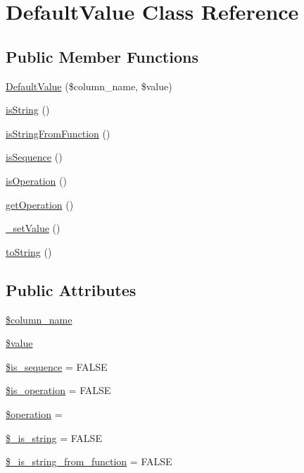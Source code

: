 \hypertarget{classDefaultValue}{}\section{Default\+Value Class Reference}
\label{classDefaultValue}
\subsection*{Public Member Functions}
\begin{DoxyCompactItemize}
\item 
\hyperlink{classDefaultValue_a738994d0f9563b86310d85ede30c2fc7}{Default\+Value} (\$column\+\_\+name, \$value)
\item 
\hyperlink{classDefaultValue_a2ff17e887cf955aea26fbb1b3e11f491}{is\+String} ()
\item 
\hyperlink{classDefaultValue_aeef8c65be1e3cfe7459916653d6d9181}{is\+String\+From\+Function} ()
\item 
\hyperlink{classDefaultValue_a5186ba40cadb8a1740edd64665f4c126}{is\+Sequence} ()
\item 
\hyperlink{classDefaultValue_af7a051370a3b8bb17d9f9cf64a03be74}{is\+Operation} ()
\item 
\hyperlink{classDefaultValue_a1e607abe2e29a00fa3ab0cecba406776}{get\+Operation} ()
\item 
\hyperlink{classDefaultValue_a1a0d50d43f32dbb3df7e11467c6938be}{\+\_\+set\+Value} ()
\item 
\hyperlink{classDefaultValue_a0f0d4d1cc64b3bfb8d2acec2b113be4d}{to\+String} ()
\end{DoxyCompactItemize}
\subsection*{Public Attributes}
\begin{DoxyCompactItemize}
\item 
\hyperlink{classDefaultValue_a671e32e797e9975b6497a56a5ba92dc6}{\$column\+\_\+name}
\item 
\hyperlink{classDefaultValue_a963ea764e6dfb5dbfe87c4b8ffd131ac}{\$value}
\item 
\hyperlink{classDefaultValue_a7ad2c3e04c79053b6299c0fa0e35389e}{\$is\+\_\+sequence} = F\+A\+L\+SE
\item 
\hyperlink{classDefaultValue_ae01855465814b8be26de7bd0b33b6778}{\$is\+\_\+operation} = F\+A\+L\+SE
\item 
\hyperlink{classDefaultValue_a0b0e52103637bbb5ea0fdedcb0672fcd}{\$operation} = \textquotesingle{}\textquotesingle{}
\item 
\hyperlink{classDefaultValue_ac3b23483d015be5b48517fb96890b64a}{\$\+\_\+is\+\_\+string} = F\+A\+L\+SE
\item 
\hyperlink{classDefaultValue_a000cf284b962d5c3354abd73b611c888}{\$\+\_\+is\+\_\+string\+\_\+from\+\_\+function} = F\+A\+L\+SE
\end{DoxyCompactItemize}


